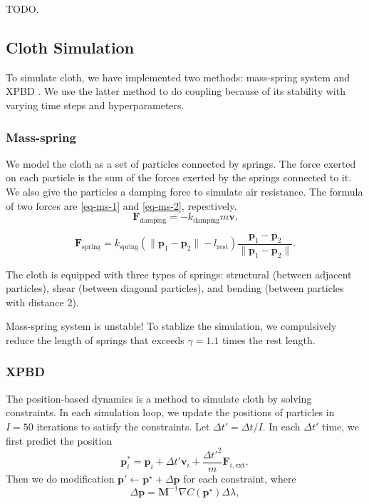 TODO.

\subsection{Cloth Simulation}

To simulate cloth, we have implemented two methods: mass-spring system and XPBD \cite{10.1145/2994258.2994272}. We use the latter method to do coupling because of its stability with varying time steps and hyperparameters.

\subsubsection{Mass-spring}

We model the cloth as a set of particles connected by springs. The force exerted on each particle is the sum of the forces exerted by the springs connected to it. We also give the particles a damping force to simulate air resistance. The formula of two forces are \eqref{eq-ms-1} and \eqref{eq-ms-2}, repectively.
\begin{equation}
  \label{eq-ms-1}
\mathbf{F}_{\text{damping}}=-k_{\text{damping}}m\mathbf{v}.
\end{equation}

\begin{equation}
  \label{eq-ms-2}
\mathbf{F}_{\text{spring}}=k_{\text{spring}}(\|\mathbf{p}_1-\mathbf{p}_2\|-l_{\text{rest}})\frac{\mathbf{p}_1-\mathbf{p}_2}{\|\mathbf{p}_1-\mathbf{p}_2\|}.
\end{equation}

The cloth is equipped with three types of springs: structural (between adjacent particles), shear (between diagonal particles), and bending (between particles with distance 2). 

Mass-spring system is unstable! To stablize the simulation, we compulsively reduce the length of springs that exceeds $\gamma=1.1$ times the rest length.

\subsubsection{XPBD}

The position-based dynamics is a method to simulate cloth by solving constraints. In each simulation loop, we update the positions of particles in $I=50$ iterations to satisfy the constraints. Let $\Delta t'=\Delta t/I$. In each $\Delta t'$ time, we first predict the position
\begin{equation}
  \label{eq-xpbd-1}
\mathbf{p}_i^*=\mathbf{p}_i+\Delta t'\mathbf{v}_i+\frac{\Delta t'^2}{m}\mathbf{F}_{i,\text{ext}},
\end{equation}
Then we do modification $\mathbf{p}'\leftarrow\mathbf{p}^\star +\Delta \mathbf{p}$ for each constraint, where
\begin{equation}
  \label{eq-xpbd-2}
\Delta \mathbf{p}=\mathbf{M}^{-1} \nabla C(\mathbf{p}^\star)\Delta \lambda,
\end{equation}

